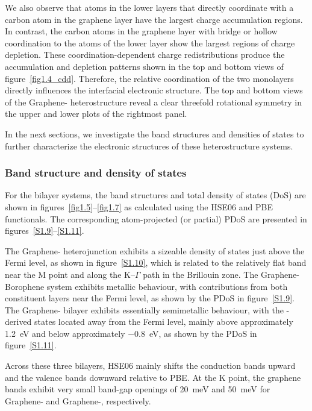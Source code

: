 We also observe that atoms in the lower layers
that directly coordinate with a carbon atom in the graphene layer
have the largest charge accumulation regions.
In contrast, the carbon atoms in the graphene layer with bridge or hollow coordination to the atoms of the lower layer show the largest regions of charge depletion.
These coordination-dependent charge redistributions produce the accumulation and depletion patterns shown in the top and bottom views of figure~\ref{fig1.4_cdd}.
Therefore, the relative coordination of the two monolayers directly influences the interfacial electronic structure.
The top and bottom views of the Graphene- heterostructure reveal a clear threefold rotational symmetry in the upper and lower plots of the rightmost panel.

In the next sections, we investigate the band structures and densities of states to further characterize the electronic structures of these heterostructure systems.

\subsubsection{Band structure and density of states}

For the bilayer systems, the band structures and total density of states (DoS) are shown in figures~\ref{fig1.5}--\ref{fig1.7} as calculated using the HSE06 and PBE functionals.
The corresponding atom-projected (or partial) PDoS are presented in figures~\ref{S1.9}--\ref{S1.11}.

The Graphene- heterojunction exhibits a sizeable density of states just above the Fermi level, as shown in figure~\ref{S1.10},
which is related to the relatively flat band near the $\mathrm{M}$ point and along the $\mathrm{K}$--$\Gamma$ path in the Brillouin zone.
The Graphene-Borophene system exhibits metallic behaviour,
with contributions from both constituent layers near the Fermi level, as shown by the PDoS in figure~\ref{S1.9}.
The Graphene- bilayer exhibits essentially semimetallic behaviour, with the -derived states located away from the Fermi level, mainly above approximately \qty{1.2}{\electronvolt} and below approximately \qty{-0.8}{\electronvolt}, as shown by the PDoS in figure~\ref{S1.11}.

Across these three bilayers,
HSE06 mainly shifts the conduction bands upward and the valence bands downward relative to PBE.
At the $\mathrm{K}$ point, the graphene bands exhibit very small band-gap openings of \qty{20}{\milli\electronvolt} and
\qty{50}{\milli\electronvolt} for Graphene- and Graphene-, respectively.


